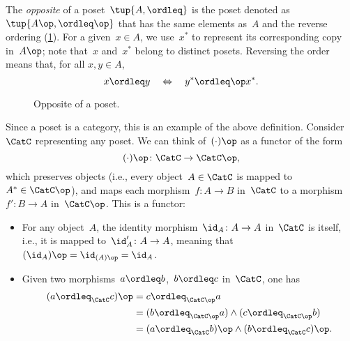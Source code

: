 \begin{example}
    The \emph{opposite} of a  poset~$\tup{A, \ordleq} $ is the poset denoted as~$\tup{A\op, \ordleq\op}$ that has the same elements as~$A$ and the reverse ordering (\cref{fig:opposite}).
    For a given~$x \in A$, we use~$x^*$ to represent its corresponding copy in~$A\op$;
    note that~$x$ and~$x^*$ belong to distinct posets.
    Reversing the order means that, for all $x,y\in A$,
    \begin{equation}
        x \ordleq y \quad \Leftrightarrow \quad y^* \ordleq\op x^*.
    \end{equation}
    \begin{figure}[tbh]
   \centering
   \caption{Opposite of a poset.\label{fig:opposite}}
\end{figure}
Since a poset is a category, this is an example of the above definition. Consider~$\CatC$ representing any poset. We can think of~$(\cdot)\op$ as a functor of the form
\begin{equation}
    (\cdot)\op\colon \CatC \to \CatC\op,
\end{equation}
which preserves objects (i.e., every object~$A \in \CatC$ is mapped to~$A^*\in \CatC\op$), and maps each morphism~$f\colon A\to B$ in~$\CatC$ to a morphism~$f'\colon B\to A$ in~$\CatC\op$. This is a functor:
\begin{itemize}
    \item For any object~$A$, the identity morphism~$\id_A\colon A\to A$ in~$\CatC$ is itself, i.e., it is mapped to~$\id_A'\colon A\to A$, meaning that~$(\id_A)\op=\id_{(A)\op}=\id_A$.
    \item Given two morphisms~$a\ordleq b$,~$b\ordleq c$ in~$\CatC$, one has
    \begin{equation}
        \begin{aligned}
        (a\ordleq_{\CatC} c)\op &=c\ordleq_{\CatC\op} a\\
        &=(b\ordleq_{\CatC\op} a)\wedge (c\ordleq_{\CatC\op}b)\\
        &=(a\ordleq_{\CatC} b)\op \wedge (b\ordleq_{\CatC} c)\op.
        \end{aligned}
    \end{equation}
\end{itemize}
\end{example}

